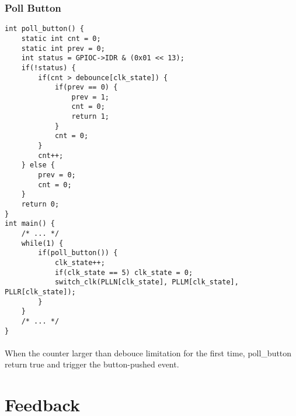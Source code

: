 \subsubsection{Poll Button}
\begin{lstlisting}
int poll_button() {
	static int cnt = 0;
	static int prev = 0;
	int status = GPIOC->IDR & (0x01 << 13);
	if(!status) {
		if(cnt > debounce[clk_state]) {
			if(prev == 0) {
				prev = 1;
				cnt = 0;
				return 1;
			}
			cnt = 0;
		}
		cnt++;
	} else {
		prev = 0;
		cnt = 0;
	}
	return 0;
}
int main() {
    /* ... */
	while(1) {
		if(poll_button()) {
			clk_state++;
			if(clk_state == 5) clk_state = 0;
			switch_clk(PLLN[clk_state], PLLM[clk_state], PLLR[clk_state]);
		}
	}
    /* ... */
}
\end{lstlisting}
\paragraph{}
When the counter larger than debouce limitation for the first time, poll\_button return true and trigger the button-pushed event.
\section{Feedback}
\paragraph{}
